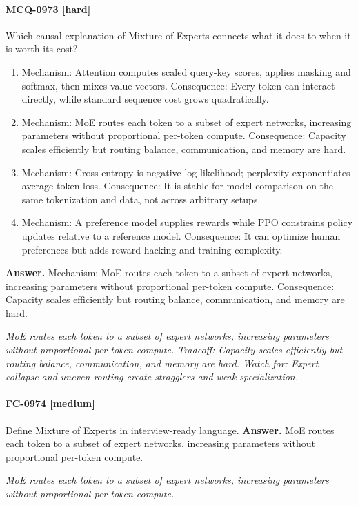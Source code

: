 \paragraph{MCQ-0973 [hard]} Which causal explanation of Mixture of Experts connects what it does to when it is worth its cost?
\begin{enumerate}[label=\Alph*.]
\item Mechanism: Attention computes scaled query-key scores, applies masking and softmax, then mixes value vectors. Consequence: Every token can interact directly, while standard sequence cost grows quadratically.
\item Mechanism: MoE routes each token to a subset of expert networks, increasing parameters without proportional per-token compute. Consequence: Capacity scales efficiently but routing balance, communication, and memory are hard.
\item Mechanism: Cross-entropy is negative log likelihood; perplexity exponentiates average token loss. Consequence: It is stable for model comparison on the same tokenization and data, not across arbitrary setups.
\item Mechanism: A preference model supplies rewards while PPO constrains policy updates relative to a reference model. Consequence: It can optimize human preferences but adds reward hacking and training complexity.
\end{enumerate}
\noindent\textbf{Answer.} Mechanism: MoE routes each token to a subset of expert networks, increasing parameters without proportional per-token compute. Consequence: Capacity scales efficiently but routing balance, communication, and memory are hard.
\par\textit{MoE routes each token to a subset of expert networks, increasing parameters without proportional per-token compute. Tradeoff: Capacity scales efficiently but routing balance, communication, and memory are hard. Watch for: Expert collapse and uneven routing create stragglers and weak specialization.}
\paragraph{FC-0974 [medium]} Define Mixture of Experts in interview-ready language.
\noindent\textbf{Answer.} MoE routes each token to a subset of expert networks, increasing parameters without proportional per-token compute.
\par\textit{MoE routes each token to a subset of expert networks, increasing parameters without proportional per-token compute.}

